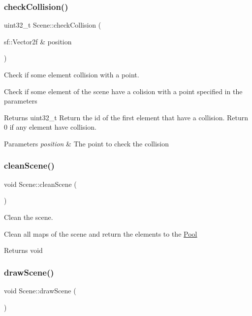 \subsubsection{\texorpdfstring{check\+Collision()}{checkCollision()}}
{\footnotesize\ttfamily uint32\+\_\+t Scene\+::check\+Collision (\begin{DoxyParamCaption}\item[{sf\+::\+Vector2f \&}]{position }\end{DoxyParamCaption})}



Check if some element collision with a point. 

Check if some element of the scene have a colision with a point specified in the parameters

\begin{DoxyReturn}{Returns}
uint32\+\_\+t Return the id of the first element that have a collision. Return 0 if any element have collision. 
\end{DoxyReturn}

\begin{DoxyParams}{Parameters}
{\em position} & The point to check the collision \\
\hline
\end{DoxyParams}
\mbox{\label{class_scene_a6c4a04bd6fb848a1bdf8d1a82792c1ef}} 
\subsubsection{\texorpdfstring{clean\+Scene()}{cleanScene()}}
{\footnotesize\ttfamily void Scene\+::clean\+Scene (\begin{DoxyParamCaption}{ }\end{DoxyParamCaption})}



Clean the scene. 

Clean all maps of the scene and return the elements to the \hyperlink{class_pool}{Pool}

\begin{DoxyReturn}{Returns}
void 
\end{DoxyReturn}
\mbox{\label{class_scene_ae27f4327ca363cc9cad8ab553504e2d5}} 
\subsubsection{\texorpdfstring{draw\+Scene()}{drawScene()}}
{\footnotesize\ttfamily void Scene\+::draw\+Scene (\begin{DoxyParamCaption}{ }\end{DoxyParamCaption})}



